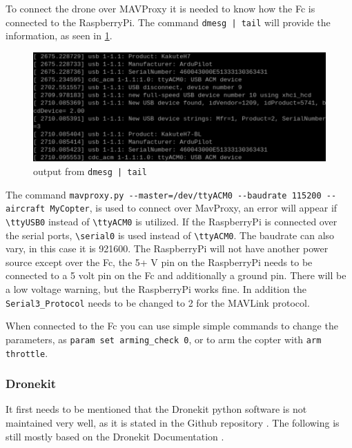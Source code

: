 \documentclass[svgnames]{article}
\begin{document}
	
	To connect the drone over MAVProxy it is needed to know how the \gls{Fc} is connected to the RaspberryPi. The command \lstinline!dmesg | tail! will provide the information, as seen in \cref{fig:usbrasppiconnect}.

\begin{figure}[th]
	\centering
	\includegraphics[width=0.7\linewidth]{pictures/USBRaspPiconnect}
	\caption{output from \lstinline!dmesg | tail!}
	\label{fig:usbrasppiconnect}
\end{figure}
	
	The command \lstinline|mavproxy.py --master=/dev/ttyACM0 --baudrate 115200 --aircraft MyCopter|, is used to connect over MavProxy, an error will appear if \lstinline|\ttyUSB0| instead of \lstinline|\ttyACM0| is utilized. If the RaspberryPi is connected over the serial ports, \lstinline|\serial0| is used instead of \lstinline|\ttyACM0|. The baudrate can also vary, in this case it is 921600. The RaspberryPi will not have another power source except over the \gls{Fc}, the 5+ V pin on the RaspberryPi needs to be connected to a 5 volt pin on the \gls{Fc} and additionally a ground pin. There will be a low voltage warning, but the RaspberryPi works fine. In addition the \lstinline|Serial3_Protocol| needs to be changed to 2 for the MAVLink protocol.
	
	When connected to the \gls{Fc} you can use simple simple commands to change the parameters, as \lstinline|param set arming_check 0|, or to arm the copter with \lstinline|arm throttle|.
	
	\subsubsection{Dronekit}
	It first needs to be mentioned that the Dronekit python software is not maintained very well, as it is stated in the Github repository \cite{dronekitgithub}. The following is still mostly based on the Dronekit Documentation \cite{dronekitdocs}.
	
	
\end{document}
